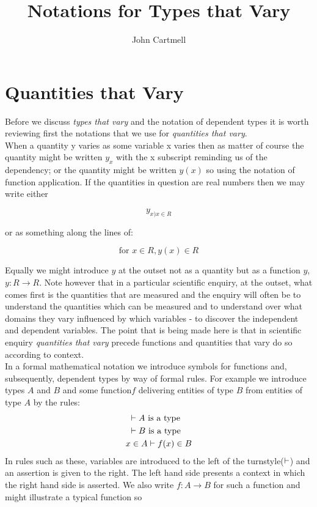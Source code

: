 \documentclass[10pt,a4paper]{article}
\title{Notations for Types that Vary}
\author{John Cartmell}
\begin{document}
\maketitle


\section{Quantities that Vary}
\noindent Before we discuss \textit{types that vary} and the notation of dependent types it is worth 
reviewing first the notations that we use for \textit{quantities that vary}.  \\

\noindent  When a quantity y varies as some variable x varies then as matter of course the quantity might be written $y_{x}$ with the x subscript  reminding us of the dependency; or the quantity might be written $y(x)$ so using the notation of function application.  
If the quantities in question are real numbers then we may write either

\begin{equation*}
y_{x)x\in R}
\end{equation*}

\noindent or as something along the lines of:

\begin{equation*}
\text{for } x \in R,  y(x) \in R
\end{equation*}

\noindent Equally we might introduce $y$ at the outset not as a quantity but as a function $y$, $y: R \rightarrow R$. Note however that in a particular scientific enquiry, at the outset, what comes first is the quantities that are measured and the enquiry will often be to understand the quantities which can be measured and to understand over what domains they vary influenced by which variables - to discover the independent and dependent variables.
The point that is being made here is that in scientific enquiry \textit{quantities that vary} precede functions and quantities that vary do so according to context. \\

\noindent In a formal mathematical notation we introduce symbols for functions and, subsequently, dependent types by way of formal rules. For example we 
introduce types $A$ and $B$ and some function$f$ delivering entities of type $B$ from entities of type $A$ by the rules:
\begin{align}
&\text{                                  }\vdash A\mbox{ is a type} \\
&\text{                                  }\vdash B\mbox{ is a type} \\
&x \in A \vdash f(x) \in B 
\end{align}
\noindent In rules such as these, variables are introduced to the left of the turnstyle($\vdash$) and 
an assertion is given to the right. The left hand side presents a context in which the right hand side is asserted. 
We also write $f: A \rightarrow B$ for such a function and might illustrate a typical function so
\end{document}
